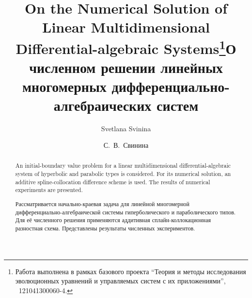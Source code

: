 \begin{englishtitle} %
\title{On the Numerical Solution of Linear Multidimensional Differential-algebraic Systems\thanks{Работа выполнена в рамках базового проекта ``Теория и методы исследования эволюционных уравнений и управляемых систем с их приложениями'', \textnumero~121041300060-4.}}
\author{Svetlana Svinina}

\maketitle

\begin{abstract}
An initial-boundary value problem for a linear multidimensional differential-algebraic system of hyperbolic and parabolic types is considered. For its numerical solution, an additive spline-collocation difference scheme is used. The results of numerical experiments are presented.

\end{abstract}
\end{englishtitle}


\iffalse
\documentclass[12pt]{llncs}  
\usepackage[T2A]{fontenc}
\usepackage[cp1251]{inputenc} 
\usepackage[english,russian]{babel}
\usepackage{todonotes}
\usepackage[russian]{nla}


\fi

\title{О численном решении линейных многомерных дифференциально-алгебраических систем}
\author{С.~В.~Свинина 
 }


\maketitle

\begin{abstract}
Рассматривается начально-краевая задача для линейной многомерной диф\-фе\-рен\-ци\-аль\-но-алгебраической системы гиперболического и параболического типов. Для её численного решения применяются аддитивная сплайн-кол\-ло\-ка\-ци\-онная разностная схема. Представлены результаты численных экспериментов.


\end{abstract}

